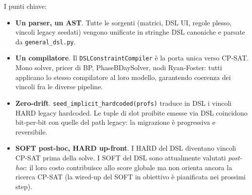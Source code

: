 I punti chiave:
\begin{itemize}
\item \textbf{Un parser, un AST}. Tutte le sorgenti (matrici,
  DSL UI, regole plesso, vincoli legacy seedati) vengono
  unificate in stringhe DSL canoniche e parsate da
  \texttt{general\_dsl.py}.
\item \textbf{Un compilatore}. Il
  \texttt{DSLConstraintCompiler} \`e la porta unica verso
  CP-SAT. Mono solver, pricer di BP, PhaseBDaySolver, nodi
  Ryan-Foster: tutti applicano lo stesso compilatore al loro
  modello, garantendo coerenza dei vincoli fra le diverse
  pipeline.
\item \textbf{Zero-drift}.
  \texttt{seed\_implicit\_hardcoded(profs)} traduce in DSL i
  vincoli HARD legacy hardcoded. Le tuple di slot proibite
  emesse via DSL coincidono bit-per-bit con quelle del path
  legacy: la migrazione \`e progressiva e reversibile.
\item \textbf{SOFT post-hoc, HARD up-front}. I HARD del DSL
  diventano vincoli CP-SAT prima della solve. I SOFT del DSL
  sono attualmente valutati \emph{post-hoc}: il loro costo
  contribuisce allo score globale ma non orienta ancora la
  ricerca CP-SAT (la wired-up del SOFT in obiettivo \`e
  pianificata nei prossimi step).
\end{itemize}

